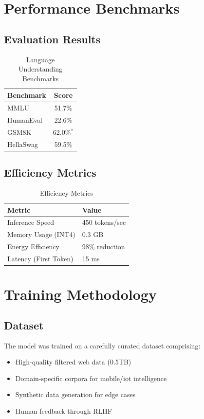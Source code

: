 \documentclass[11pt,a4paper]{article}
\begin{document}
\section{Performance Benchmarks}

\subsection{Evaluation Results}

\begin{table}[H]
\centering
\begin{tabular}{lc}
\toprule
\textbf{Benchmark} & \textbf{Score} \\
\midrule
MMLU & 51.7\% \\
HumanEval & 22.6\% \\
GSM8K & 62.0\%$^{*}$ \\
HellaSwag & 59.5\% \\
\bottomrule
\end{tabular}
\caption{Language Understanding Benchmarks}
\end{table}

\subsection{Efficiency Metrics}

\begin{table}[H]
\centering
\begin{tabular}{ll}
\toprule
\textbf{Metric} & \textbf{Value} \\
\midrule
Inference Speed & 450 tokens/sec \\
Memory Usage (INT4) & 0.3 GB \\
Energy Efficiency & 98\% reduction \\
Latency (First Token) & 15 ms \\
\bottomrule
\end{tabular}
\caption{Efficiency Metrics}
\end{table}

\section{Training Methodology}

\subsection{Dataset}
The model was trained on a carefully curated dataset comprising:
\begin{itemize}
    \item High-quality filtered web data (0.5TB)
    \item Domain-specific corpora for mobile/iot intelligence
    \item Synthetic data generation for edge cases
    \item Human feedback through RLHF
\end{itemize}
\end{document}
